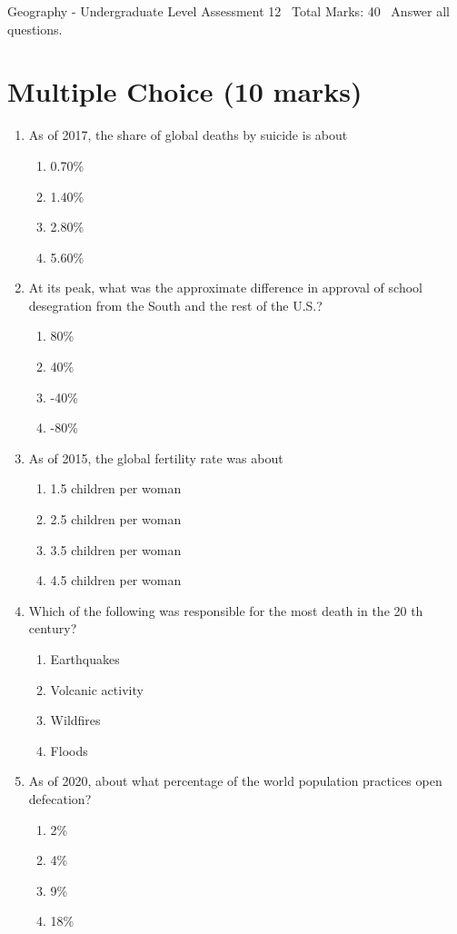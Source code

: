 \documentclass[12pt]{article}
\begin{document}
\begin{center}
Geography - Undergraduate Level Assessment 12 \
Total Marks: 40 \
Answer all questions.
\end{center}

\section*{Multiple Choice (10 marks)}
\begin{enumerate}[label=\arabic*.]
\item As of 2017, the share of global deaths by suicide is about
\begin{enumerate}[label=(\alph*)]
    \item 0.70\%
    \item 1.40\%
    \item 2.80\%
    \item 5.60\%
\end{enumerate}
\item At its peak, what was the approximate difference in approval of school desegration from the South and the rest of the U.S.?
\begin{enumerate}[label=(\alph*)]
    \item 80\%
    \item 40\%
    \item -40\%
    \item -80\%
\end{enumerate}
\item As of 2015, the global fertility rate was about
\begin{enumerate}[label=(\alph*)]
    \item 1.5 children per woman
    \item 2.5 children per woman
    \item 3.5 children per woman
    \item 4.5 children per woman
\end{enumerate}
\item Which of the following was responsible for the most death in the 20 th century?
\begin{enumerate}[label=(\alph*)]
    \item Earthquakes
    \item Volcanic activity
    \item Wildfires
    \item Floods
\end{enumerate}
\item As of 2020, about what percentage of the world population practices open defecation?
\begin{enumerate}[label=(\alph*)]
    \item 2\%
    \item 4\%
    \item 9\%
    \item 18\%
\end{enumerate}
\end{enumerate}
\end{document}
